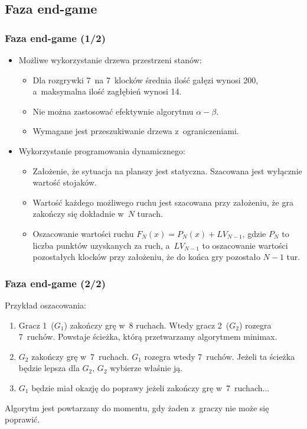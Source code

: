 \documentclass[10pt,a4paper]{beamer}
\begin{document}
\subsection{Faza end-game}

\begin{frame}
	\frametitle{Faza end-game (1/2)}
	
	\begin{itemize}
		\item Możliwe wykorzystanie drzewa przestrzeni stanów:
		\begin{itemize}
			\item Dla rozgrywki 7~na 7~klocków średnia ilość gałęzi wynosi 200, a~maksymalna ilość zagłębień wynosi 14.
			\item Nie można zastosować efektywnie algorytmu $\alpha - \beta$.
			\item Wymagane jest przeszukiwanie drzewa z~ograniczeniami.
		\end{itemize}
		\item Wykorzystanie programowania dynamicznego:
			\begin{itemize}
				\item Założenie, że sytuacja na planszy jest statyczna. Szacowana jest wyłącznie wartość stojaków.
				\item Wartość każdego możliwego ruchu jest szacowana przy założeniu, że gra zakończy się dokładnie w~$N$ turach.
				\item Oszacowanie wartości ruchu $F_{N}(x) = P_{N}(x) + LV_{N-1}$, gdzie $P_{N}$ to liczba punktów uzyskanych za ruch, a~$LV_{N-1}$ to oszacowanie wartości pozostałych klocków przy założeniu, że do końca gry pozostało $N-1$ tur.
			\end{itemize}
	\end{itemize}
\end{frame}

\begin{frame}
	\frametitle{Faza end-game (2/2)}
	
	Przykład oszacowania:

	\begin{enumerate}
		\item Gracz 1~($G_{1}$) zakończy grę w~8 ruchach. Wtedy gracz 2~($G_{2}$) rozegra 7~ruchów. Powstaje ścieżka, którą przetwarzamy algorytmem minimax.
		\item $G_{2}$ zakończy grę w~7~ruchach. $G_{1}$ rozegra wtedy 7~ruchów. Jeżeli ta ścieżka będzie lepsza dla $G_{2}$, $G_{2}$ wybierze właśnie ją.
		\item $G_{1}$ będzie miał okazję do poprawy jeżeli zakończy grę w~7~ruchach...
	 \end{enumerate}

	 Algorytm jest powtarzany do momentu, gdy żaden z~graczy nie może się poprawić.
\end{frame}
\end{document}
